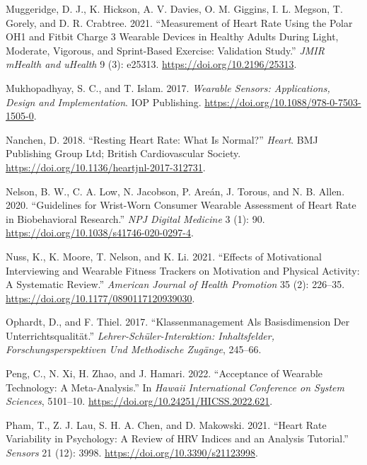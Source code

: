\documentclass[preprint,
3p]{elsarticle} %
\newlength{\cslhangindent}
\newenvironment{CSLReferences}[2] %
 {\begin{list}{}{%
  \setlength{\itemindent}{0pt}
  \setlength{\leftmargin}{0pt}
  \setlength{\parsep}{0pt}
  \ifodd #1
   \setlength{\leftmargin}{\cslhangindent}
   \setlength{\itemindent}{-1\cslhangindent}
  \fi
  \setlength{\itemsep}{#2\baselineskip}}}
 {\end{list}}
\begin{document}
\begin{CSLReferences}{1}{0}
Muggeridge, D. J., K. Hickson, A. V. Davies, O. M. Giggins, I. L.
Megson, T. Gorely, and D. R. Crabtree. 2021. {``Measurement of Heart
Rate Using the Polar OH1 and Fitbit Charge 3 Wearable Devices in Healthy
Adults During Light, Moderate, Vigorous, and Sprint-Based Exercise:
Validation Study.''} \emph{JMIR mHealth and uHealth} 9 (3): e25313.
\url{https://doi.org/10.2196/25313}.

Mukhopadhyay, S. C., and T. Islam. 2017. \emph{Wearable Sensors:
Applications, Design and Implementation}. IOP Publishing.
\url{https://doi.org/10.1088/978-0-7503-1505-0}.

Nanchen, D. 2018. {``Resting Heart Rate: What Is Normal?''}
\emph{Heart}. BMJ Publishing Group Ltd; British Cardiovascular Society.
\url{https://doi.org/10.1136/heartjnl-2017-312731}.

Nelson, B. W., C. A. Low, N. Jacobson, P. Areán, J. Torous, and N. B.
Allen. 2020. {``Guidelines for Wrist-Worn Consumer Wearable Assessment
of Heart Rate in Biobehavioral Research.''} \emph{NPJ Digital Medicine}
3 (1): 90. \url{https://doi.org/10.1038/s41746-020-0297-4}.

Nuss, K., K. Moore, T. Nelson, and K. Li. 2021. {``Effects of
Motivational Interviewing and Wearable Fitness Trackers on Motivation
and Physical Activity: A Systematic Review.''} \emph{American Journal of
Health Promotion} 35 (2): 226--35.
\url{https://doi.org/10.1177/0890117120939030}.

Ophardt, D., and F. Thiel. 2017. {``Klassenmanagement Als Basisdimension
Der Unterrichtsqualit{ä}t.''} \emph{Lehrer-Sch{ü}ler-Interaktion:
Inhaltsfelder, Forschungsperspektiven Und Methodische Zug{ä}nge},
245--66.

Peng, C., N. Xi, H. Zhao, and J. Hamari. 2022. {``Acceptance of Wearable
Technology: A Meta-Analysis.''} In \emph{Hawaii International Conference
on System Sciences}, 5101--10.
\url{https://doi.org/10.24251/HICSS.2022.621}.

Pham, T., Z. J. Lau, S. H. A. Chen, and D. Makowski. 2021. {``Heart Rate
Variability in Psychology: A Review of HRV Indices and an Analysis
Tutorial.''} \emph{Sensors} 21 (12): 3998.
\url{https://doi.org/10.3390/s21123998}.


\end{CSLReferences}
\end{document}
